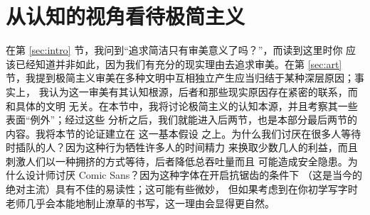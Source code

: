 \section{从认知的视角看待极简主义}\label{sec:cognitive}

在第 \ref{sec:intro} 节，我问到“追求简洁只有审美意义了吗？”，而读到这里时你
应该已经知道并非如此，因为我们有充分的现实理由去追求审美。在第 \ref{sec:art}
节，我提到极简主义审美在多种文明中互相独立产生应当归结于某种深层原因；事实上，
我认为这一审美有其认知根源，后者和那些现实原因存在紧密的联系，而和具体的文明
无关。在本节中，我将讨论极简主义的认知本源，并且考察其一些表面“例外”；经过这些
分析之后，我们就能进入后两节，也是本部分最后两节的内容。我将本节的论证建立在%
这一基本假设
之上。为什么我们讨厌在很多人等待时插队的人？因为这种行为牺牲许多人的时间精力
来换取少数几人的利益，而且刺激人们以一种拥挤的方式等待，后者降低总吞吐量而且
可能造成安全隐患。为什么设计师讨厌 Comic Sans？因为这种字体在开启抗锯齿的条件下
（这是当今的绝对主流）具有不佳的易读性；这可能有些微妙，
但如果考虑到在你初学写字时老师几乎会本能地制止潦草的书写，这一理由会显得更自然。

